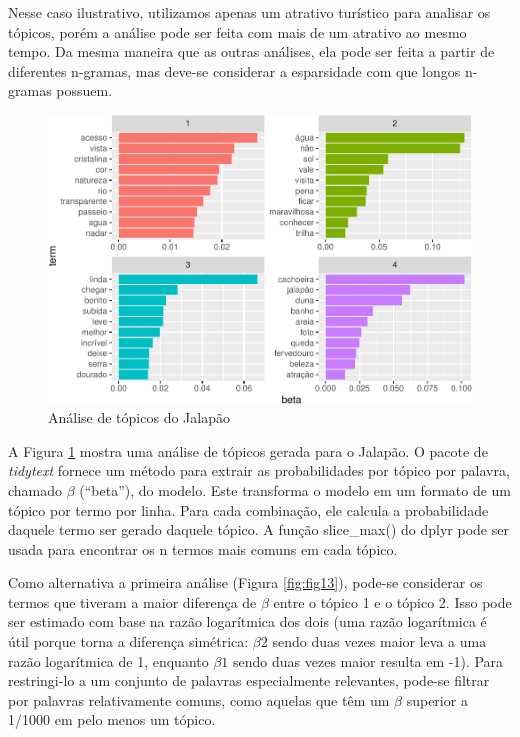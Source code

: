\documentclass[preprint, 3p,
authoryear]{elsarticle} %
\begin{document}
Nesse caso ilustrativo, utilizamos apenas um atrativo turístico para
analisar os tópicos, porém a análise pode ser feita com mais de um
atrativo ao mesmo tempo. Da mesma maneira que as outras análises, ela
pode ser feita a partir de diferentes n-gramas, mas deve-se considerar a
esparsidade com que longos n-gramas possuem.

\begin{figure}[H]

{\centering \includegraphics{bookdown-artigo_files/figure-latex/fig12-1} 

}

\caption{Análise de tópicos do Jalapão}\label{fig:fig12}
\end{figure}

A Figura \ref{fig:fig12} mostra uma análise de tópicos gerada para o
Jalapão. O pacote de \emph{tidytext} fornece um método para extrair as
probabilidades por tópico por palavra, chamado \(\beta\) (``beta''), do
modelo. Este transforma o modelo em um formato de um tópico por termo
por linha. Para cada combinação, ele calcula a probabilidade daquele
termo ser gerado daquele tópico. A função slice\_max() do dplyr pode ser
usada para encontrar os n termos mais comuns em cada tópico.

Como alternativa a primeira análise (Figura \ref{fig:fig13}), pode-se
considerar os termos que tiveram a maior diferença de \(\beta\) entre o
tópico 1 e o tópico 2. Isso pode ser estimado com base na razão
logarítmica dos dois (uma razão logarítmica é útil porque torna a
diferença simétrica: \(\beta2\) sendo duas vezes maior leva a uma razão
logarítmica de 1, enquanto \(\beta1\) sendo duas vezes maior resulta em
-1). Para restringi-lo a um conjunto de palavras especialmente
relevantes, pode-se filtrar por palavras relativamente comuns, como
aquelas que têm um \(\beta\) superior a 1/1000 em pelo menos um tópico.
\end{document}
